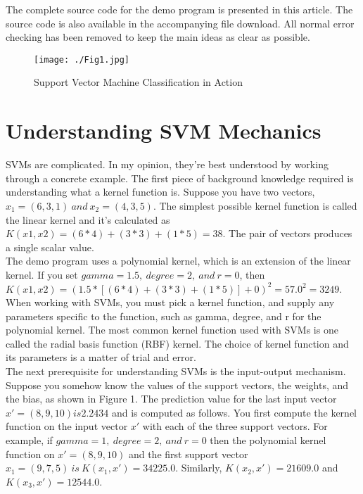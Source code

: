 \documentclass[13pt]{article}
\begin{document}
\noindent
The complete source code for the demo program is presented in this article. The source code is also available in the accompanying file download. All normal error checking has been removed to keep the main ideas as clear as possible.

\begin{figure}
\texttt{[image: ./Fig1.jpg]}
\caption{Support Vector Machine Classification in Action}
\end{figure}
\newpage


\section{Understanding SVM Mechanics}
SVMs are complicated. In my opinion, they're best understood by working through a concrete example. The first piece of background knowledge required is understanding what a kernel function is. Suppose you have two vectors, $x_1 = (6, 3, 1)\ and\ x_2 = (4, 3, 5)$. The simplest possible kernel function is called the linear kernel and it's calculated as $K(x1, x2) = (6 * 4) + (3 * 3) + (1 * 5) = 38$. The pair of vectors produces a single scalar value.\\

\noindent
The demo program uses a polynomial kernel, which is an extension of the linear kernel. If you set $gamma = 1.5,\ degree = 2, \ and \ r = 0$, then $K(x1, x2) = ( 1.5 * [(6 * 4) + (3 * 3) + (1 * 5)] + 0 )^2 = 57.0^2 = 3249$.\\

\noindent
When working with SVMs, you must pick a kernel function, and supply any parameters specific to the function, such as gamma, degree, and r for the polynomial kernel. The most common kernel function used with SVMs is one called the radial basis function (RBF) kernel. The choice of kernel function and its parameters is a matter of trial and error.\\

\noindent
The next prerequisite for understanding SVMs is the input-output mechanism. Suppose you somehow know the values of the support vectors, the weights, and the bias, as shown in Figure 1. The prediction value for the last input vector $x' = (8, 9, 10) is 2.2434$ and is computed as follows. You first compute the kernel function on the input vector $x'$ with each of the three support vectors. For example, if $gamma = 1,\ degree = 2,\ and\ r = 0$ then the polynomial kernel function on $x' = (8, 9, 10)$ and the first support vector $x_1 = (9, 7, 5)\ is\ K(x_1, x') = 34225.0$. Similarly, $K(x_2, x')= 21609.0$ and $K(x_3, x') = 12544.0$.\\
\end{document}
